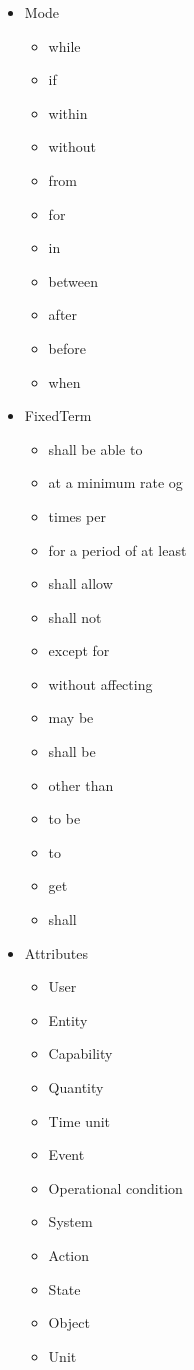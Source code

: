 \begin{itemize}
\item
  Mode
  \begin{itemize}
  \item
    while
  \item
    if
  \item
    within
  \item
    without
  \item
    from
  \item
    for
  \item
    in
  \item
    between
  \item
    after
  \item
    before
  \item
    when
  \end{itemize}
\item
  FixedTerm
  \begin{itemize}
  \item
    shall be able to
  \item
    at a minimum rate og
  \item
    times per
  \item
    for a period of at least
  \item
    shall allow
  \item
    shall not
  \item
    except for
  \item
    without affecting
  \item
    may be
  \item
    shall be
  \item
    other than
  \item
    to be
  \item
    to
  \item
    get
  \item
    shall
  \end{itemize}
\item
  Attributes
  \begin{itemize}
  \item
    User
  \item
    Entity
  \item
    Capability
  \item
    Quantity
  \item
    Time unit
  \item
    Event
  \item
    Operational condition
  \item
    System
  \item
    Action
  \item
    State
  \item
    Object
  \item
    Unit
  \end{itemize}
\end{itemize}
